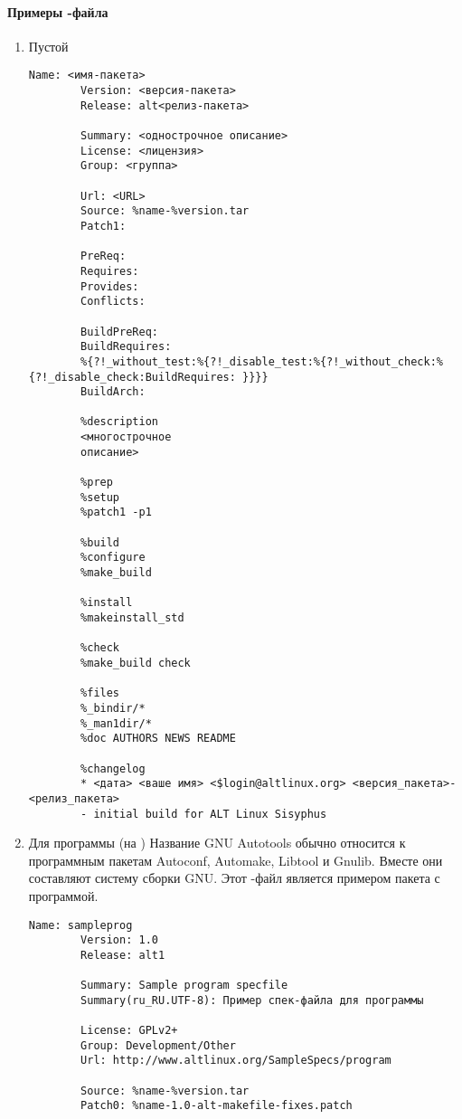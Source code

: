 \paragraph{Примеры -файла}
\begin{enumerate}
	\item Пустой 
	\begin{Verbatim}[breaklines=true,breakanywhere=true,xleftmargin=-2.95cm]
		Name: <имя-пакета>
		Version: <версия-пакета>
		Release: alt<релиз-пакета>
		
		Summary: <однострочное описание>
		License: <лицензия>
		Group: <группа>
		
		Url: <URL>
		Source: %name-%version.tar
		Patch1:
		
		PreReq:
		Requires:
		Provides:
		Conflicts:
		
		BuildPreReq:
		BuildRequires:
		%{?!_without_test:%{?!_disable_test:%{?!_without_check:%{?!_disable_check:BuildRequires: }}}}
		BuildArch:
		
		%description
		<многострочное
		описание>
		
		%prep
		%setup
		%patch1 -p1
		
		%build
		%configure
		%make_build
		
		%install
		%makeinstall_std
		
		%check
		%make_build check
		
		%files
		%_bindir/*
		%_man1dir/*
		%doc AUTHORS NEWS README
		
		%changelog
		* <дата> <ваше имя> <$login@altlinux.org> <версия_пакета>-<релиз_пакета>
		- initial build for ALT Linux Sisyphus
	\end{Verbatim}
	
	\item Для программы (на )
	Название GNU Autotools обычно относится к программным пакетам Autoconf, Automake, Libtool и Gnulib. Вместе они составляют систему сборки GNU. Этот -файл является примером пакета с программой.
	\begin{Verbatim}[breaklines=true,breakanywhere=true,xleftmargin=-2.95cm]
		Name: sampleprog
		Version: 1.0
		Release: alt1
		
		Summary: Sample program specfile
		Summary(ru_RU.UTF-8): Пример спек-файла для программы
		
		License: GPLv2+
		Group: Development/Other
		Url: http://www.altlinux.org/SampleSpecs/program
		
		Source: %name-%version.tar
		Patch0: %name-1.0-alt-makefile-fixes.patch
		

\end{Verbatim}
\end{enumerate}
